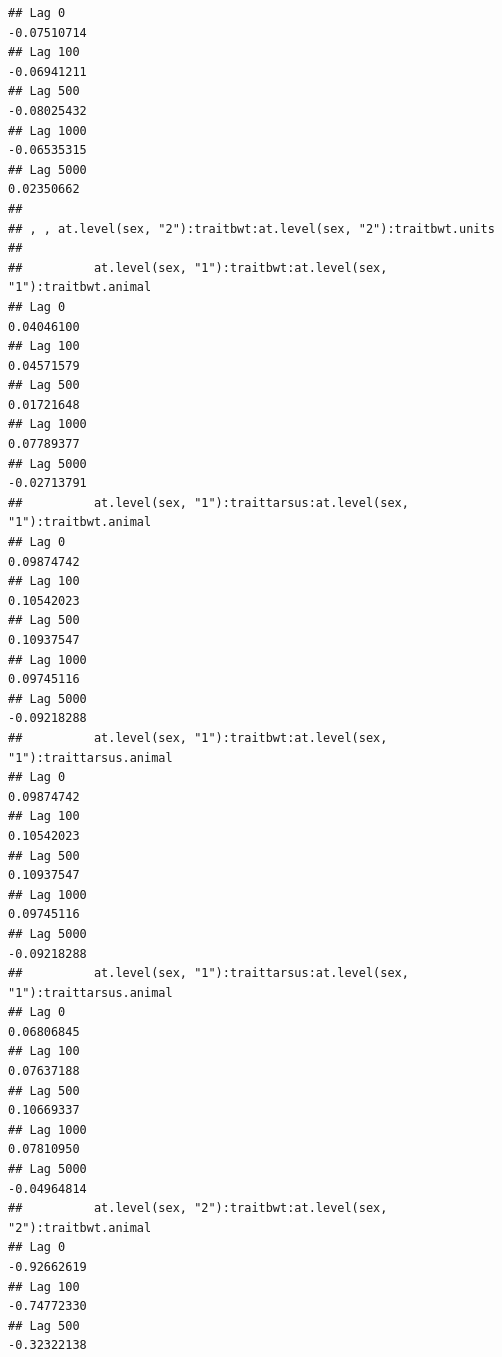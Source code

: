 \documentclass[
  12pt,
]{book}
\begin{document}
\begin{verbatim}
## Lag 0                                                            -0.07510714
## Lag 100                                                          -0.06941211
## Lag 500                                                          -0.08025432
## Lag 1000                                                         -0.06535315
## Lag 5000                                                          0.02350662
## 
## , , at.level(sex, "2"):traitbwt:at.level(sex, "2"):traitbwt.units
## 
##          at.level(sex, "1"):traitbwt:at.level(sex, "1"):traitbwt.animal
## Lag 0                                                        0.04046100
## Lag 100                                                      0.04571579
## Lag 500                                                      0.01721648
## Lag 1000                                                     0.07789377
## Lag 5000                                                    -0.02713791
##          at.level(sex, "1"):traittarsus:at.level(sex, "1"):traitbwt.animal
## Lag 0                                                           0.09874742
## Lag 100                                                         0.10542023
## Lag 500                                                         0.10937547
## Lag 1000                                                        0.09745116
## Lag 5000                                                       -0.09218288
##          at.level(sex, "1"):traitbwt:at.level(sex, "1"):traittarsus.animal
## Lag 0                                                           0.09874742
## Lag 100                                                         0.10542023
## Lag 500                                                         0.10937547
## Lag 1000                                                        0.09745116
## Lag 5000                                                       -0.09218288
##          at.level(sex, "1"):traittarsus:at.level(sex, "1"):traittarsus.animal
## Lag 0                                                              0.06806845
## Lag 100                                                            0.07637188
## Lag 500                                                            0.10669337
## Lag 1000                                                           0.07810950
## Lag 5000                                                          -0.04964814
##          at.level(sex, "2"):traitbwt:at.level(sex, "2"):traitbwt.animal
## Lag 0                                                       -0.92662619
## Lag 100                                                     -0.74772330
## Lag 500                                                     -0.32322138

\end{verbatim}
\end{document}
